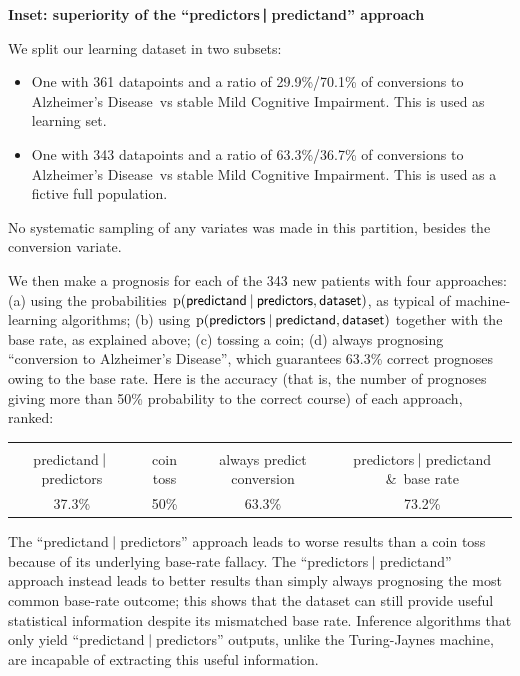 \documentclass[utf8]{FrontiersinHarvard} %
\newcommand*{\amp}{\&}
\newcommand*{\p}{\mathrm{p}}%
\renewcommand*{\|}[1][]{\nonscript\:#1\vert\nonscript\:\mathopen{}}
\newcommand*{\ad}{Alzheimer's Disease}
\newcommand*{\mci}{Mild Cognitive Impairment}
\newcommand*{\tjm}{Turing-Jaynes machine}
\begin{document}
\begin{table}[!b]
  \begin{framed}
  \small
  \begin{center}
    \textbf{Inset: superiority of the \enquote{predictors$\pmb{\|}$predictand} approach}
  \end{center}
    We split our learning dataset in two subsets:
    \begin{itemize}
    \item One with 361 datapoints and a ratio of 29.9\%/70.1\% of conversions to \ad\ vs stable \mci. This is used as learning set.
    \item One with 343 datapoints and a ratio of 63.3\%/36.7\% of conversions to \ad\ vs stable \mci. This is used as a fictive full population.
    \end{itemize}
    No systematic sampling of any variates was made in this partition, besides the conversion variate.

    We then make a prognosis for each of the 343 new patients with four approaches: (a) using the probabilities $\p(\textsf{predictand} \| \textsf{predictors}, \textsf{dataset})$, as typical of machine-learning algorithms; (b) using $\p(\textsf{predictors} \| \textsf{predictand}, \textsf{dataset})$ together with the base rate, as explained above; (c) tossing a coin; (d) always prognosing \enquote{conversion to \ad}, which guarantees 63.3\% correct prognoses owing to the base rate. Here is the accuracy (that is, the number of prognoses giving more than 50\% probability to the correct course) of each approach, ranked:

    \medskip
    { 
      \centering
      \begin{tabular}{cccc}
        \hline\\[-\jot]
        {\scriptsize predictand$\|$predictors}&{\scriptsize coin toss}&{\scriptsize always predict conversion}&{\scriptsize predictors$\|$predictand \amp\ base rate}
        \\[1\jot]
        37.3\% & 50\% & 63.3\% & 73.2\%\\[\jot]
        \hline
      \end{tabular}

    }
    \medskip
    
    The \enquote{predictand$\|$predictors} approach leads to worse results than a coin toss because of its underlying base-rate fallacy. The \enquote{predictors$\|$predictand} approach instead leads to better results than simply always prognosing the most common base-rate outcome; this shows that the dataset can still provide useful statistical information despite its mismatched base rate. Inference algorithms that only yield \enquote{predictand$\|$predictors} outputs, unlike the \tjm, are incapable of extracting this useful information.
  \end{framed}
\end{table}
\end{document}
